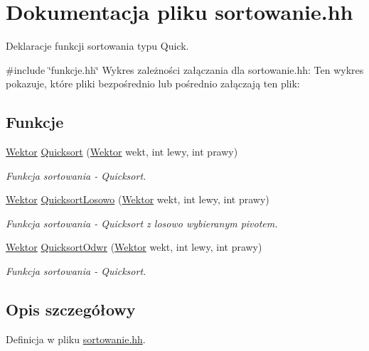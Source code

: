 \hypertarget{sortowanie_8hh}{\section{\-Dokumentacja pliku sortowanie.\-hh}
\label{sortowanie_8hh}
}


\-Deklaracje funkcji sortowania typu \-Quick.  


{\ttfamily \#include \char`\"{}funkcje.\-hh\char`\"{}}\*
\-Wykres zależności załączania dla sortowanie.\-hh\-:
\-Ten wykres pokazuje, które pliki bezpośrednio lub pośrednio załączają ten plik\-:
\subsection*{\-Funkcje}
\begin{DoxyCompactItemize}
\item 
\hyperlink{class_wektor}{\-Wektor} \hyperlink{sortowanie_8hh_a5689f0782f1d5aeabd6b88c6518c02ca}{\-Quicksort} (\hyperlink{class_wektor}{\-Wektor} wekt, int lewy, int prawy)
\begin{DoxyCompactList}\small\item\em \-Funkcja sortowania -\/ \-Quicksort. \end{DoxyCompactList}\item 
\hyperlink{class_wektor}{\-Wektor} \hyperlink{sortowanie_8hh_ab34381410c631ebd453c0d37a9ceb451}{\-Quicksort\-Losowo} (\hyperlink{class_wektor}{\-Wektor} wekt, int lewy, int prawy)
\begin{DoxyCompactList}\small\item\em \-Funkcja sortowania -\/ \-Quicksort z losowo wybieranym pivotem. \end{DoxyCompactList}\item 
\hyperlink{class_wektor}{\-Wektor} \hyperlink{sortowanie_8hh_a34cbc659ad09b7d7f2e9867f92670a50}{\-Quicksort\-Odwr} (\hyperlink{class_wektor}{\-Wektor} wekt, int lewy, int prawy)
\begin{DoxyCompactList}\small\item\em \-Funkcja sortowania -\/ \-Quicksort. \end{DoxyCompactList}\end{DoxyCompactItemize}


\subsection{\-Opis szczegółowy}


\-Definicja w pliku \hyperlink{sortowanie_8hh_source}{sortowanie.\-hh}.



